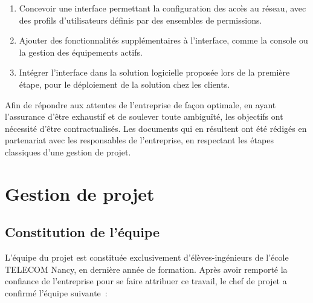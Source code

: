 \begin{enumerate}
\item Concevoir une interface permettant la configuration des accès au réseau, avec des profils d'utilisateurs définis par des ensembles de permissions.
\item Ajouter des fonctionnalités supplémentaires à l'interface, comme la console ou la gestion des équipements actifs.
\item Intégrer l'interface dans la solution logicielle proposée lors de la première étape, pour le déploiement de la solution chez les clients.
\end{enumerate}

Afin de répondre aux attentes de l'entreprise de façon optimale, en ayant l'assurance d'être exhaustif et de soulever toute ambiguïté, les objectifs ont nécessité d'être contractualisés. Les documents qui en résultent ont été rédigés en partenariat avec les responsables de l'entreprise, en respectant les étapes classiques d'une gestion de projet.

\section{Gestion de projet}
\subsection{Constitution de l'équipe}

L'équipe du projet est constituée exclusivement d'élèves-ingénieurs de l'école TELECOM Nancy, en dernière année de formation. Après avoir remporté la confiance de l'entreprise pour se faire attribuer ce travail, le chef de projet a confirmé l'équipe suivante~:

